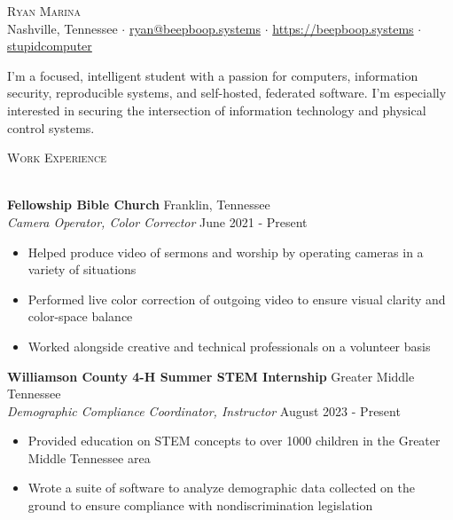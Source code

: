 \documentclass{article}
\newcommand{\lineunder} {
    \vspace*{-8pt} \\
    \hspace*{-18pt} \hrulefill \\
}
\newcommand{\header} [1] {
    {\hspace*{-18pt}\vspace*{6pt} \textsc{#1}}
    \vspace*{-6pt} \lineunder
}
\newcommand{\workexp} [4] {
	\hspace*{-18pt} \textbf{#1} \hfill #2\\
	\hspace*{-18pt} \textit{#3} \hfill #4\\
	\vspace{-1mm}
}
\begin{document}
\vspace*{-50pt}

\begin{center}
	{\Huge \scshape {Ryan Marina}}\\
	\vspace{2px}
	\faMapMarker \vspace{1px} Nashville, Tennessee $\cdot$ \faPaperPlane \vspace{1px} \href{mailto:ryan@beepboop.systems}{ryan@beepboop.systems} $\cdot$ \faServer \vspace{1px} \href{https://beepboop.systems}{https://beepboop.systems} $\cdot$ \faGithubSquare \vspace{1px} \href{https://github.com/stupidcomputer}{stupidcomputer}\\
\end{center}

\vspace{-5mm}

\begin{center}
I'm a focused, intelligent student with a passion for computers, information security, reproducible systems, and self-hosted, federated software.
I'm especially interested in securing the intersection of information technology and physical control systems.
\end{center}

\vspace{-2mm}

\header{Work Experience}
\vspace{1mm}

\workexp{Fellowship Bible Church}{Franklin, Tennessee}{Camera Operator, Color Corrector}{June 2021 - Present}

\begin{itemize} \itemsep 0.5pt
	\item Helped produce video of sermons and worship by operating cameras in a variety of situations
	\item Performed live color correction of outgoing video to ensure visual clarity and color-space balance
	\item Worked alongside creative and technical professionals on a volunteer basis
\end{itemize}

\vspace{-2mm}

\workexp{Williamson County 4-H Summer STEM Internship}{Greater Middle Tennessee}{Demographic Compliance Coordinator, Instructor}{August 2023 - Present}
\begin{itemize} \itemsep 0.5pt
	\item Provided education on STEM concepts to over 1000 children in the Greater Middle Tennessee area
	\item Wrote a suite of software to analyze demographic data collected on the ground to ensure compliance with nondiscrimination legislation
\end{itemize}
\end{document}
